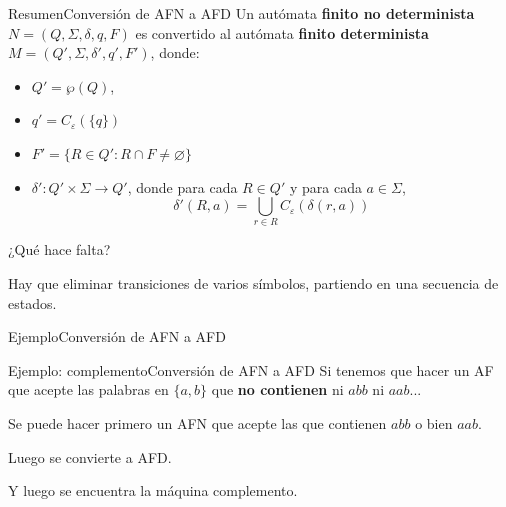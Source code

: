 \documentclass[spanish, handout]{beamer}
\begin{document}
  \begin{frame}{Resumen}{Conversión de AFN a AFD}
      Un autómata \textbf{finito no determinista} $N = (Q, \Sigma, \delta, q, F)$ es convertido al autómata \textbf{finito determinista} $M = (Q', \Sigma, \delta', q', F')$, donde: \pause
      
      \bigskip

      \begin{itemize}
        \itemsep1.5ex
        \item $Q' = \wp(Q)$, \pause
        \item $q'= C_\varepsilon(\{q\})$ \pause
        \item $F' = \{R \in Q' : R \cap F \neq \varnothing\}$ \pause
        \item $\delta' : Q' \times \Sigma \to Q'$, donde para cada $R \in Q'$ y para cada $a \in \Sigma$,
        \[\delta'(R,a) = \bigcup_{r \in R} C_\varepsilon (\delta (r,a))\]
      \end{itemize} \pause

      \bigskip

      ¿Qué hace falta? \pause

      Hay que eliminar transiciones de varios símbolos, partiendo en una secuencia de estados.

  \end{frame}

  \begin{frame}{Ejemplo}{Conversión de AFN a AFD}
    \begin{center}
    \end{center}      
  \end{frame}

  \begin{frame}{Ejemplo: complemento}{Conversión de AFN a AFD}
      Si tenemos que hacer un AF que acepte las palabras en $\{a,b\}$ que \textbf{no contienen} ni $abb$ ni $aab$... \pause

      \bigskip

      Se puede hacer primero un AFN que acepte las que contienen $abb$ o bien $aab$. \pause

      \bigskip

      Luego se convierte a AFD. \pause

      \bigskip

      Y luego se encuentra la máquina complemento.
  \end{frame}
\end{document}
